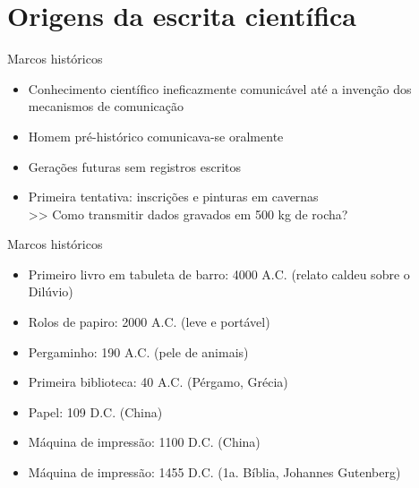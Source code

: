 
\section{Origens da escrita científica}

\begin{frame}{Marcos históricos}
\begin{itemize}
\item Conhecimento científico ineficazmente comunicável até a invenção dos mecanismos de comunicação
\item Homem pré-histórico comunicava-se oralmente 
\item Gerações futuras sem registros escritos 
\item Primeira tentativa: inscrições e pinturas em cavernas \\
>> Como transmitir dados gravados em 500 kg de rocha?
\end{itemize}
\end{frame}


\begin{frame}{Marcos históricos}
\begin{itemize}
\item Primeiro livro em tabuleta de barro: 4000 A.C. (relato caldeu sobre o Dilúvio) 
\item Rolos de papiro: 2000 A.C. (leve e portável)
\item Pergaminho: 190 A.C. (pele de animais)
\item Primeira biblioteca: 40 A.C. (Pérgamo, Grécia)
\item Papel: 109 D.C. (China) 
\item Máquina de impressão: 1100 D.C. (China) 
\item Máquina de impressão: 1455 D.C. (1a. Bíblia, Johannes Gutenberg) 
\end{itemize}
\end{frame}

